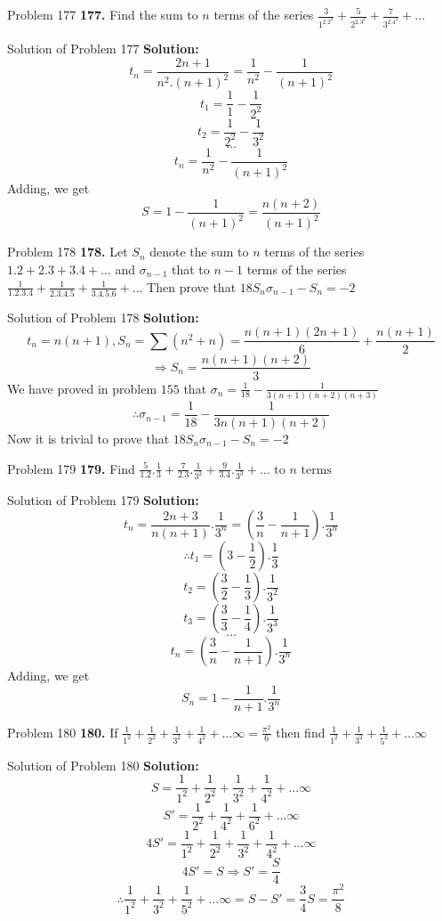 \documentclass[aspectratio=1610,8pt]{beamer}
\begin{document}
\begin{frame}{Problem 177}
  \textbf{177.} Find the sum to $n$ terms of the series $\frac{3}{1^2.2^2} + \frac{5}{2^2.3^2} + \frac{7}{3^2.4^2} + \ldots$
\end{frame}
\begin{frame}{Solution of Problem 177}
  \textbf{Solution:} $$t_n = \frac{2n + 1}{n^2.(n + 1)^2} = \frac{1}{n^2} - \frac{1}{(n + 1)^2}$$
  $$t_1 = \frac{1}{1} - \frac{1}{2^2}$$
  $$t_2 = \frac{1}{2^2} - \frac{1}{3^2}$$
  $$\ldots$$
  $$t_n = \frac{1}{n^2} - \frac{1}{(n + 1)^2}$$
  Adding, we get
  $$S = 1 - \frac{1}{(n + 1)^2} = \frac{n(n + 2)}{(n + 1)^2}$$
\end{frame}
\begin{frame}{Problem 178}
  \textbf{178.} Let $S_n$ denote the sum to $n$ terms of the series $1.2 + 2.3 + 3.4 + \ldots$ and $\sigma_{n - 1}$ that to $n - 1$
  terms of the series $\frac{1}{1.2.3.4} + \frac{1}{2.3.4.5} + \frac{1}{3.4.5.6} + \ldots$ Then prove that $18S_n\sigma_{n - 1} -
  S_n = -2$
\end{frame}
\begin{frame}{Solution of Problem 178}
  \textbf{Solution:} $$t_n = n(n + 1), S_n = \sum(n^2 + n) = \frac{n(n + 1)(2n + 1)}{6} + \frac{n(n +1)}{2}$$
  $$\Rightarrow S_n = \frac{n(n + 1)(n + 2)}{3}$$
  We have proved in problem $155$ that $\sigma_n = \frac{1}{18} - \frac{1}{3(n + 1)(n + 2)(n + 3)}$
  $$\therefore \sigma_{n - 1} = \frac{1}{18} - \frac{1}{3n(n + 1)(n + 2)}$$
  Now it is trivial to prove that $18S_n\sigma_{n - 1} - S_n = -2$
\end{frame}
\begin{frame}{Problem 179}
  \textbf{179.} Find $\frac{5}{1.2}.\frac{1}{3} + \frac{7}{2.3}.\frac{1}{3^2} + \frac{9}{3.4}.\frac{1}{3^3} +
  \ldots\text{~to~}n\text{~terms}$
\end{frame}
\begin{frame}{Solution of Problem 179}
  \textbf{Solution:} $$t_n = \frac{2n + 3}{n(n + 1)}.\frac{1}{3^n} = \left(\frac{3}{n} - \frac{1}{n + 1}\right).\frac{1}{3^n}$$
  $$\therefore t_1 = \left(3 - \frac{1}{2}\right).\frac{1}{3}$$
  $$t_2 = \left(\frac{3}{2} - \frac{1}{3}\right).\frac{1}{3^2}$$
  $$t_3 = \left(\frac{3}{3} - \frac{1}{4}\right).\frac{1}{3^3}$$
  $$\ldots$$
  $$t_n = \left(\frac{3}{n} - \frac{1}{n + 1}\right).\frac{1}{3^n}$$
  Adding, we get
  $$S_n = 1 - \frac{1}{n + 1}.\frac{1}{3^n}$$
\end{frame}
\begin{frame}{Problem 180}
  \textbf{180.} If $\frac{1}{1^2} + \frac{1}{2^2} + \frac{1}{3^2} + \frac{1}{4^2} + \ldots\infty = \frac{\pi^2}{6}$ then find
  $\frac{1}{1^2} + \frac{1}{3^2} + \frac{1}{5^2} + \ldots \infty$
\end{frame}
\begin{frame}{Solution of Problem 180}
  \textbf{Solution:} $$S = \frac{1}{1^2} + \frac{1}{2^2} + \frac{1}{3^2} + \frac{1}{4^2} + \ldots\infty$$
  $$S' = \frac{1}{2^2} + \frac{1}{4^2} + \frac{1}{6^2} + \ldots \infty$$
  $$4S' = \frac{1}{1^2} + \frac{1}{2^2} + \frac{1}{3^2} + \frac{1}{4^2} + \ldots\infty$$
  $$4S' = S \Rightarrow S' = \frac{S}{4}$$
  $$\therefore \frac{1}{1^2} + \frac{1}{3^2} + \frac{1}{5^2} + \ldots \infty = S - S' = \frac{3}{4}S = \frac{\pi^2}{8}$$
\end{frame}
\end{document}
